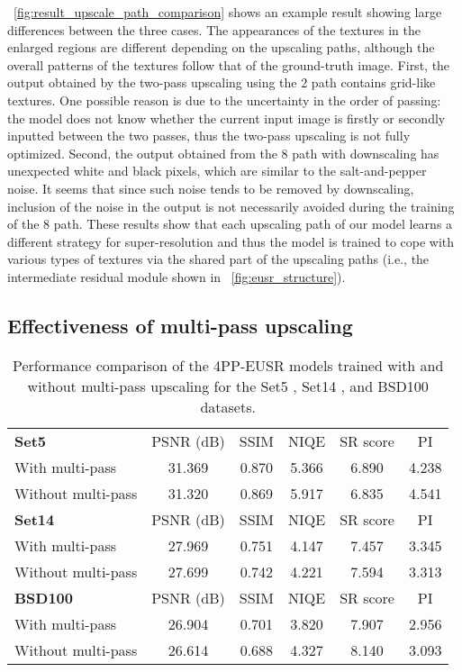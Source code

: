 \documentclass[runningheads]{llncs}
\begin{document}
\figurename~\ref{fig:result_upscale_path_comparison} shows an example result showing large differences between the three cases.
The appearances of the textures in the enlarged regions are different depending on the upscaling paths, although the overall patterns of the textures follow that of the ground-truth image.
First, the output obtained by the two-pass upscaling using the 2 path contains grid-like textures.
One possible reason is due to the uncertainty in the order of passing: the model does not know whether the current input image is firstly or secondly inputted between the two passes, thus the two-pass upscaling is not fully optimized.
Second, the output obtained from the 8 path with downscaling has unexpected white and black pixels, which are similar to the salt-and-pepper noise.
It seems that since such noise tends to be removed by downscaling, inclusion of the noise in the output is not necessarily avoided during the training of the 8 path.
These results show that each upscaling path of our model learns a different strategy for super-resolution and thus the model is trained to cope with various types of textures via the shared part of the upscaling paths (i.e., the intermediate residual module shown in \figurename~\ref{fig:eusr_structure}).


\subsection{Effectiveness of multi-pass upscaling}
\label{sec:multipass_effectiveness}


\begin{table}[t]
	\setlength{\tabcolsep}{0.4em}
	\scriptsize
	\centering
	\caption{Performance comparison of the 4PP-EUSR models trained with and without multi-pass upscaling for the Set5 \cite{bevilacqua2012low}, Set14 \cite{zeyde2010single}, and BSD100 \cite{martin2001database} datasets.}
	\label{table:result_multipass_comparison}
	\begin{tabular}{lccccc}
		\textbf{Set5} & PSNR (dB) & SSIM & NIQE & SR score & PI \\
		\noalign{\smallskip}
		\hline
		\noalign{\smallskip}
		With multi-pass & 31.369 & 0.870 & 5.366 & 6.890 & 4.238 \\
		Without multi-pass & 31.320 & 0.869 & 5.917 & 6.835 & 4.541 \\
		\noalign{\smallskip}
		\noalign{\smallskip}
		\textbf{Set14} & PSNR (dB) & SSIM & NIQE & SR score & PI \\
		\noalign{\smallskip}
		\hline
		\noalign{\smallskip}
		With multi-pass & 27.969 & 0.751 & 4.147 & 7.457 & 3.345 \\
		Without multi-pass & 27.699 & 0.742 & 4.221 & 7.594 & 3.313 \\
		\noalign{\smallskip}
		\noalign{\smallskip}
		\textbf{BSD100} & PSNR (dB) & SSIM & NIQE & SR score & PI \\
		\noalign{\smallskip}
		\hline
		\noalign{\smallskip}
		With multi-pass & 26.904 & 0.701 & 3.820 & 7.907 & 2.956 \\
		Without multi-pass & 26.614 & 0.688 & 4.327 & 8.140 & 3.093 \\
	\end{tabular}
\end{table}
\end{document}
